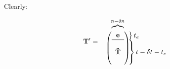 \documentclass{article}
\begin{document}
Clearly:

\begin{equation}
	\mathbf{T'}=
	\begin{array}{cl}
		\hspace{0.1cm}
	\overbrace{\hphantom{\begin{array}{c}
	\mathbf{\tilde{T}} \end{array}}}^{n-\delta n}&\\\

	\left(
	\begin{array}{c} \mathbf{e} \\ \hline \\
		\mathbf{\tilde{T}} \\ {} \\ \end{array}
	\right)&

	\hspace{-1.0cm}
	\begin{array}{l}\left. \begin{array}{c} {} \end{array}\right\}t_e \\
	\left.\begin{array}{c} \\ \\ \\
	\end{array}\right\} t-\delta t-t_e
	\end{array}

\end{array}
\end{equation}
\end{document}
